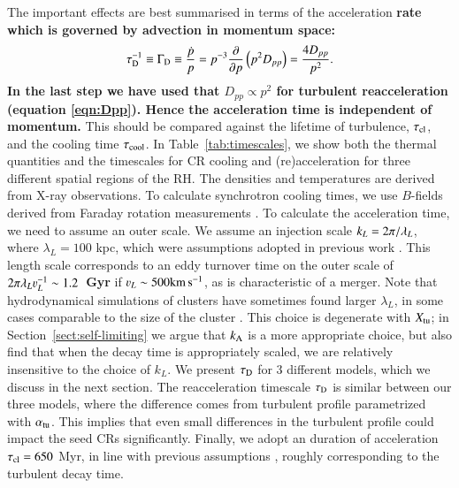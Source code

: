 \documentclass[fleqn,usenatbib,useAMS]{mnras}
\newcommand\C[1]{{\bf #1}}
\begin{document}
The important effects are best summarised in terms of the acceleration \C{rate
  which is governed by advection in momentum space:
\begin{equation}
  \tau_{\rm D}^{-1}\equiv \Gamma_{\rm D}\equiv
  \frac{\dot{p}}{p}=p^{-3}\frac{\partial}{\partial p}\left(p^2D_{pp}\right)
  =\frac{4 D_{pp}}{p^{2}}.
\end{equation}
In the last step we have used that $D_{pp}\propto p^2$ for turbulent
reacceleration (equation \ref{eqn:Dpp}). Hence the acceleration time is independent of momentum.}
This should be compared against the lifetime of turbulence, $\tau_{\rm cl}$, and the cooling time $\tau_{\rm cool}$. In Table~\ref{tab:timescales}, we show both the thermal quantities and the
timescales for CR cooling and (re)acceleration for three different
spatial regions of the RH. The densities \citep{1992A&A...259L..31B} and temperatures \citep{2009ApJ...696.1886B,2001A&A...365L..67A} are derived from X-ray observations. To calculate synchrotron cooling times, we use $B$-fields derived from Faraday rotation measurements \citep{bonafede10}. To calculate the acceleration time, we need to assume an outer scale. We assume an injection scale $k_L=2\pi/\lambda_L$, where $\lambda_L = 100$ kpc, which were assumptions adopted in previous work \citep{2006MNRAS.366.1437S,brunetti07, brunetti11}. This length scale corresponds to an eddy turnover time on the outer scale of \C{$2\upi\lambda_L\varv_L^{-1} \sim 1.2$~Gyr} if $\varv_L \sim 500 {\rm km \, s^{-1}}$, as is characteristic of a merger. Note that hydrodynamical simulations of clusters have sometimes found larger $\lambda_L$, in some cases comparable to the size of the cluster \C{\citep[e.g. $\lambda_L \sim 1 {\rm Mpc}$ in ][]{vazza11,miniati15}}. This choice is degenerate with $X_{\rm tu}$; in Section~\ref{sect:self-limiting} we argue that $k_{\rm A}$ is a more appropriate choice, but also find that when the decay time is appropriately scaled, we are relatively insensitive to the choice of $k_L$. We present $\tau_{\rm D}$ for 3 different models, which we discuss in the next section. The reacceleration timescale
$\tau_{\rm D}$ is similar between our three models, where the
difference comes from turbulent profile parametrized with
$\alpha_{\mathrm{tu}}$. This implies that even small differences in the
turbulent profile could impact the seed CRs significantly. Finally, we adopt an duration of acceleration $\tau_{\rm cl} = 650$ Myr, in line with previous assumptions \citep{brunetti07}, roughly corresponding to the turbulent decay time. 
\end{document}
